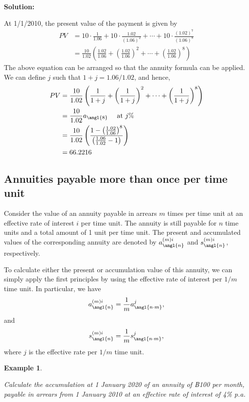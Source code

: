 \documentclass[landscape, 20pt]{extreport}
\theoremstyle{definition}
\theoremstyle{definition}
\newtheorem{example}{Example}[chapter]
\theoremstyle{definition}
\theoremstyle{definition}
\theoremstyle{remark}
\begin{document}
\textbf{Solution:}

At 1/1/2010, the present value of the payment is given by
\[\begin{aligned}
    PV &= 10 \cdot \frac{1}{1.06} + 10 \cdot \frac{1.02}{(1.06)^2} + \cdots +  10 \cdot \frac{(1.02)^7}{(1.06)^8} \\
        &= \frac{10}{1.02} \left(  \frac{1.02}{1.06} +  \left(  \frac{1.02}{1.06}  \right)^2 + \cdots +
    \left(  \frac{1.02}{1.06}  \right)^8  \right)\end{aligned}\] The
above equation can be arranged so that the annuity formula can be
applied. We can define \(j\) such that \(1 + j = 1.06/1.02\), and hence,
\[\begin{aligned}
    PV &= \frac{10}{1.02} \left(  \frac{1}{1 + j} +  \left(  \frac{1}{1+j}  \right)^2 + \cdots +
    \left(  \frac{1}{1+j}  \right)^8  \right)  \\
    &=   \frac{10}{1.02}  a_\angl{8} \quad  \text{ at } j\% \\
    &=  \frac{10}{1.02} \left(   \frac{1 - \left(\frac{1.02}{1.06}\right)^8   }{\left(   \frac{1.06}{1.02}   - 1 \right)}  \right) \\
    &= 66.2216\end{aligned}\]

\hypertarget{annuities-payable-more-than-once-per-time-unit}{%
\subsection{Annuities payable more than once per time unit}\label{annuities-payable-more-than-once-per-time-unit}}

Consider the value of an annuity payable in arrears \(m\) times per time
unit at an effective rate of interest \(i\) per time unit. The annuity is
still payable for \(n\) time units and a total amount of 1 unit per time
unit. The present and accumulated values of the corresponding annuity
are denoted by \(a^{(m)i}_\angl{n}\) and \(s^{(m)i}_\angl{n}\),
respectively.

To calculate either the present or accumulation value of this annuity,
we can simply apply the first principles by using the effective rate of
interest per \(1/m\) time unit. In particular, we have
\[a^{(m)i}_\angl{n}   = \frac{1}{m}  a^j_\angl{n\cdot m},\] and
\[s^{(m)i}_\angl{n}   = \frac{1}{m}  s^j_\angl{n\cdot m},\] where \(j\) is
the effective rate per \(1/m\) time unit.

\newpage \begin{example}
\protect\hypertarget{exm:unlabeled-div-30}{}\label{exm:unlabeled-div-30}

\emph{Calculate the accumulation at 1 January 2020 of an
annuity of ฿100 per month, payable in arrears from 1 January 2010 at an
effective rate of interest of 4\% p.a.}

\end{example}
\end{document}
